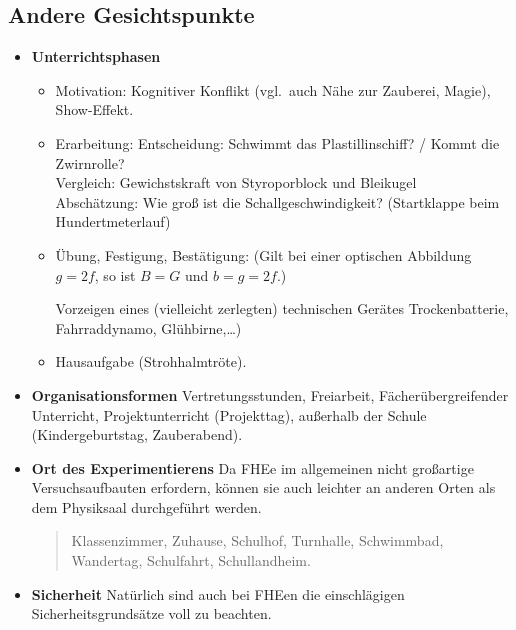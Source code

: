 \subsection{Andere Gesichtspunkte}
\begin{itemize}

	\item
	{\bf Unterrichtsphasen}
	\begin{itemize}
		\item
		Motivation:
		Kognitiver Konflikt (vgl.\ auch N\"{a}he zur Zauberei, Magie),
		Show-Effekt.
		\item
		Erarbeitung:
		Entscheidung: Schwimmt das Plastillinschiff? /
		Kommt die Zwirnrolle? \\
		Vergleich: Gewichstskraft von Styroporblock und Bleikugel \\
		Absch\"{a}tzung: Wie gro{\ss} ist die Schallgeschwindigkeit?
		(Startklappe beim Hundertmeterlauf)
		\item
		\"{U}bung, Festigung, Best\"{a}tigung:
		(Gilt bei einer optischen Abbildung
		$g = 2f$, so ist $B=G$ und $b = g = 2f$.)
		
		Vorzeigen eines (vielleicht zerlegten) technischen Ger\"{a}tes
		Trockenbatterie, Fahrraddynamo, Gl\"{u}hbirne,\dots)
		
		\item
		Hausaufgabe (Strohhalmtr\"{o}te).
	\end{itemize}
	
	\item
	{\bf Organisationsformen}
	Vertretungsstunden, Freiarbeit, F\"{a}cher\"{u}bergreifender Unterricht,
	Projektunterricht (Projekttag),
	au{\ss}erhalb der Schule (Kindergeburtstag, Zauberabend).
	
	\item
	{\bf Ort des Experimentierens}
	Da FHEe im allgemeinen nicht gro{\ss}artige Versuchsaufbauten
	erfordern, k\"{o}nnen sie auch leichter an anderen Orten
	als dem Physiksaal durchgef\"{u}hrt werden.
	
	\begin{quote}
		Klassenzimmer, Zuhause, Schulhof, Turnhalle,
		Schwimmbad, Wandertag, Schulfahrt, Schul\-land\-heim.
	\end{quote}
	
	\item
	{\bf Sicherheit}
	Nat\"{u}rlich sind auch bei FHEen die
	einschl\"{a}gigen Sicherheitsgrunds\"{a}tze voll zu beachten.
	

\end{itemize}
